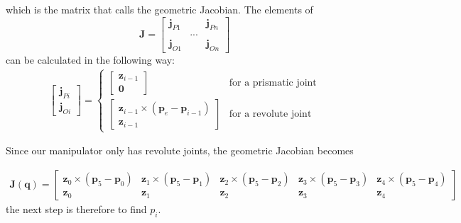 which is the matrix that \cite{Siciliano} calls the geometric Jacobian. The elements of 
$$
\bm{J} = 
\begin{bmatrix}
    \bm{j}_{P1} & & \bm{j}_{Pn}\\
    &...&\\
    \bm{j}_{O1} & & \bm{j}_{On}
\end{bmatrix}
$$
can be calculated in the following way:
\begin{align*}
    \begin{bmatrix}
        \bm{j}_{Pi}\\\bm{j}_{Oi}
    \end{bmatrix}
    =
    \begin{cases}
        \begin{bmatrix} \bm{z}_{i-1}\\ \bm{0} \end{bmatrix} & \text{for a prismatic joint}\\
        \begin{bmatrix} \bm{z}_{i-1} \times (\bm{p}_e-\bm{p}_{i-1}) \\ \bm{z}_{i-1} \end{bmatrix} & \text{for a revolute joint}
    \end{cases}
\end{align*}

Since our manipulator only has revolute joints, the geometric Jacobian becomes

\begin{align*}
    \bm{J}(\bm{q}) = 
    \begin{bmatrix}
        \bm{z}_0 \times (\bm{p}_5-\bm{p}_0) & 
        \bm{z}_1 \times (\bm{p}_5-\bm{p}_1) & 
        \bm{z}_2 \times (\bm{p}_5-\bm{p}_2) & 
        \bm{z}_3 \times (\bm{p}_5-\bm{p}_3) & 
        \bm{z}_4 \times (\bm{p}_5-\bm{p}_4) \\
        \bm{z}_0 &
        \bm{z}_1 &
        \bm{z}_2 &
        \bm{z}_3 &
        \bm{z}_4
    \end{bmatrix}
\end{align*}
the next step is therefore to find $p_i$. 

























































